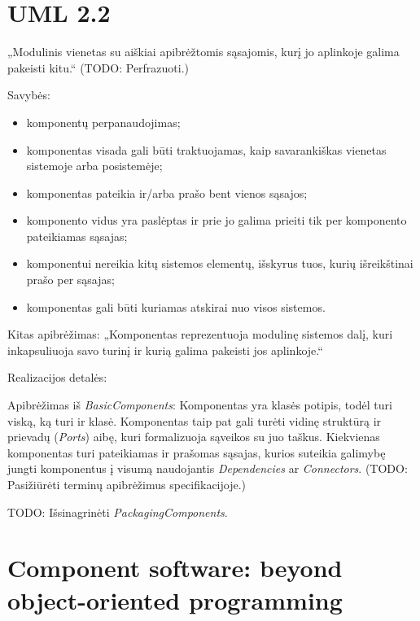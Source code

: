 \section{UML 2.2}

„Modulinis vienetas su aiškiai apibrėžtomis sąsajomis, kurį jo
aplinkoje galima pakeisti kitu.“\cite[143]{UML-superstructure}
(TODO: Perfrazuoti.)

Savybės:
\begin{itemize}
  \item komponentų perpanaudojimas;
  \item komponentas visada gali būti traktuojamas, kaip savarankiškas
    vienetas sistemoje arba posistemėje;
  \item komponentas pateikia ir/arba prašo bent vienos sąsajos;
  \item komponento vidus yra paslėptas ir prie jo galima prieiti tik
    per komponento pateikiamas sąsajas;
  \item komponentui nereikia kitų sistemos elementų, išskyrus tuos, kurių
    išreikštinai prašo per sąsajas;
  \item komponentas gali būti kuriamas atskirai nuo visos sistemos.
\end{itemize}

Kitas apibrėžimas: „Komponentas reprezentuoja modulinę sistemos dalį, kuri
inkapsuliuoja savo turinį ir kurią galima pakeisti jos aplinkoje.“
\cite[146]{UML-superstructure}

\begin{note}
  Realizacijos detalės:

  Apibrėžimas iš
  \emph{BasicComponents}\cite[146]{UML-superstructure}: Komponentas yra
  klasės potipis, todėl turi viską, ką turi ir klasė.  Komponentas
  taip pat gali turėti vidinę struktūrą ir prievadų (\emph{Ports})
  aibę, kuri formalizuoja sąveikos su juo taškus. Kiekvienas
  komponentas turi pateikiamas ir prašomas sąsajas, kurios suteikia
  galimybę jungti komponentus į visumą naudojantis
  \emph{Dependencies} ar \emph{Connectors}. (TODO: Pasižiūrėti
  terminų apibrėžimus specifikacijoje.)

  TODO: Išsinagrinėti \emph{PackagingComponents}.
\end{note}

\section{Component software: beyond object-oriented programming}

